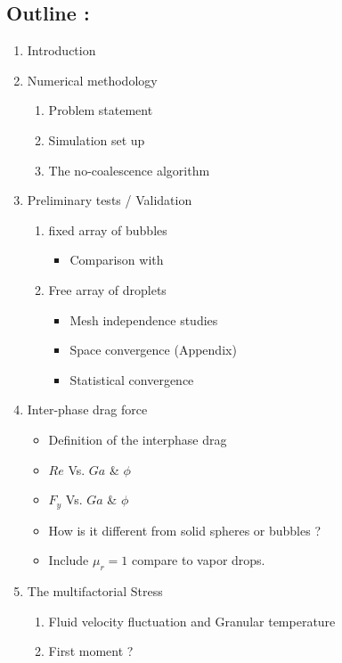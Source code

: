 \documentclass[12pt]{book}
\begin{document}
\subsection*{Outline :}
\begin{enumerate}
    \item Introduction
    \item Numerical methodology
    \begin{enumerate}
        \item Problem statement 
        \item Simulation set up
        \item The no-coalescence algorithm
    \end{enumerate}
    \item Preliminary tests / Validation
    \begin{enumerate}
        \item fixed array of bubbles 
        \begin{itemize}
            \item Comparison with \citet{esmaeeli2005direct}
        \end{itemize}
        \item Free array of droplets
        \begin{itemize}
            \item Mesh independence studies 
            \item Space convergence (Appendix)
            \item Statistical convergence
        \end{itemize}
    \end{enumerate}
    \item Inter-phase drag force
    \begin{itemize}
        \item Definition of the interphase drag  
        \item $Re$ Vs. $Ga$ \& $\phi$ 
        \item $F_y$ Vs. $Ga$ \& $\phi$
        \item How is it different from solid spheres or bubbles ?
        \item Include $\mu_r =1$ compare to vapor drops. 
    \end{itemize}
    \item The multifactorial Stress
    \begin{enumerate}
        \item Fluid velocity fluctuation and Granular temperature
        \item First moment  ? 

\end{enumerate}
\end{enumerate}
\end{document}
